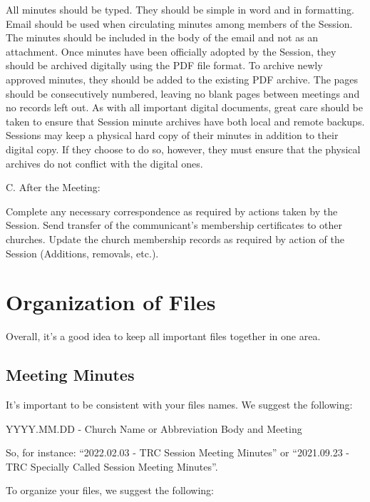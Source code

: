 \documentclass[
]{book}
\begin{document}
All minutes should be typed. They should be simple in word and in formatting. Email should be used when circulating minutes among members of the Session. The minutes should be included in the body of the email and not as an attachment. Once minutes have been officially adopted by the Session, they should be archived digitally using the PDF file format. To archive newly approved minutes, they should be added to the existing PDF archive. The pages should be consecutively numbered, leaving no blank pages between meetings and no records left out. As with all important digital documents, great care should be taken to ensure that Session minute archives have both local and remote backups. Sessions may keep a physical hard copy of their minutes in addition to their digital copy. If they choose to do so, however, they must ensure that the physical archives do not conflict with the digital ones.

C. After the Meeting:

Complete any necessary correspondence as required by actions taken by the Session.
Send transfer of the communicant's membership certificates to other churches.
Update the church membership records as required by action of the Session (Additions, removals, etc.).

\hypertarget{organization-of-files}{%
\chapter{Organization of Files}\label{organization-of-files}}

Overall, it's a good idea to keep all important files together in one area.

\hypertarget{meeting-minutes}{%
\section{Meeting Minutes}\label{meeting-minutes}}

It's important to be consistent with your files names. We suggest the following:

YYYY.MM.DD - Church Name or Abbreviation \textbar{} Body and Meeting

So, for instance: ``2022.02.03 - TRC Session Meeting Minutes'' or ``2021.09.23 - TRC Specially Called Session Meeting Minutes''.

To organize your files, we suggest the following:
\end{document}
